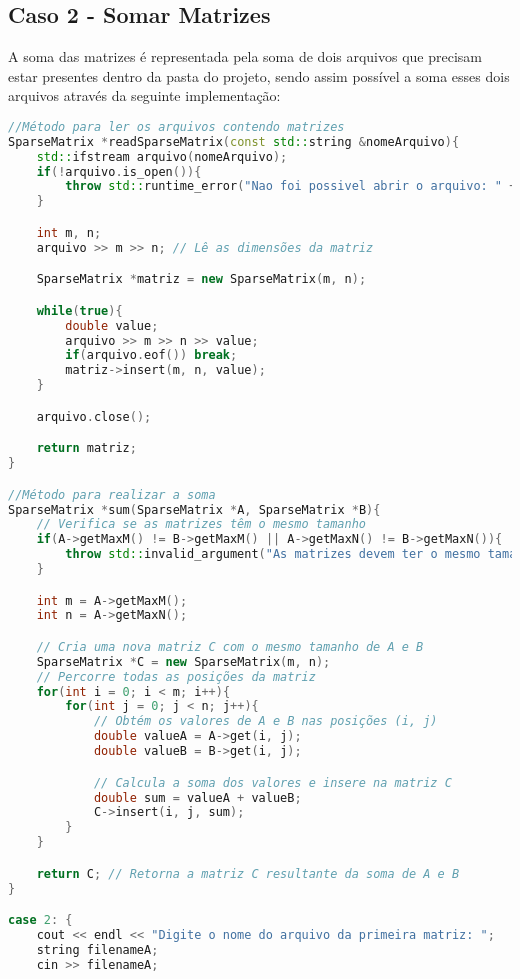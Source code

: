 \documentclass[a4paper,12pt]{article}
\begin{document}
\subsection{Caso 2 - Somar Matrizes}

A soma das matrizes é representada pela soma de dois arquivos que precisam estar presentes dentro da pasta do projeto, sendo assim possível a soma esses dois arquivos através da seguinte implementação:


\begin{lstlisting}[language=C++]
//Método para ler os arquivos contendo matrizes
SparseMatrix *readSparseMatrix(const std::string &nomeArquivo){
    std::ifstream arquivo(nomeArquivo);
    if(!arquivo.is_open()){
        throw std::runtime_error("Nao foi possivel abrir o arquivo: " + nomeArquivo);
    }

    int m, n;
    arquivo >> m >> n; // Lê as dimensões da matriz

    SparseMatrix *matriz = new SparseMatrix(m, n);

    while(true){
        double value;
        arquivo >> m >> n >> value;
        if(arquivo.eof()) break;
        matriz->insert(m, n, value);
    }

    arquivo.close();

    return matriz;
}

//Método para realizar a soma
SparseMatrix *sum(SparseMatrix *A, SparseMatrix *B){
    // Verifica se as matrizes têm o mesmo tamanho
    if(A->getMaxM() != B->getMaxM() || A->getMaxN() != B->getMaxN()){
        throw std::invalid_argument("As matrizes devem ter o mesmo tamanho para serem somadas.");
    }

    int m = A->getMaxM();
    int n = A->getMaxN();

    // Cria uma nova matriz C com o mesmo tamanho de A e B
    SparseMatrix *C = new SparseMatrix(m, n);
    // Percorre todas as posições da matriz
    for(int i = 0; i < m; i++){
        for(int j = 0; j < n; j++){
            // Obtém os valores de A e B nas posições (i, j)
            double valueA = A->get(i, j);
            double valueB = B->get(i, j);

            // Calcula a soma dos valores e insere na matriz C
            double sum = valueA + valueB;
            C->insert(i, j, sum);
        }
    }

    return C; // Retorna a matriz C resultante da soma de A e B
}

case 2: {
    cout << endl << "Digite o nome do arquivo da primeira matriz: ";
    string filenameA;
    cin >> filenameA;


\end{lstlisting}
\end{document}
